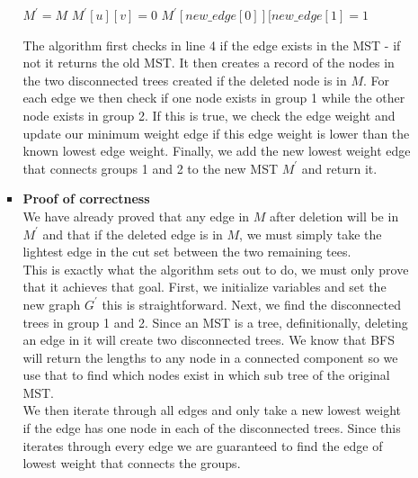 \documentclass[letterpaper,11pt]{article}
\begin{document}
\begin{enumerate}
\begin{enumerate}
\begin{itemize}
\begin{algorithm}[H]
                    $M^{\prime} = M$ \;
                    $M^{\prime}[u][v] = 0$ \;
                    $M^{\prime}[new\_edge[0]][new\_edge[1] = 1$ \;

                \end{algorithm}

                The algorithm first checks in line 4 if the edge exists in the 
                MST - if not it returns the old MST. It then creates a record
                of the nodes in the two disconnected trees created if the 
                deleted node is in $M$. For each edge we then check if one node
                exists in group 1 while the other node exists in group 2. If this
                is true, we check the edge weight and update our minimum weight
                edge if this edge weight is lower than the known lowest edge weight.
                Finally, we add the new lowest weight edge that connects groups 
                1 and 2 to the new MST $M^{\prime}$ and return it.\\


                \item \textbf{Proof of correctness}\\
                     
                    We have already proved that any edge in $M$ after deletion 
                    will be in $M^{\prime}$ and that if the deleted edge is in
                    $M$, we must simply take the lightest edge in the cut set 
                    between the two remaining tees.\\

                    This is exactly what the algorithm sets out to do, we must 
                    only prove that it achieves that goal. First, we initialize 
                    variables and set the new graph $G^{\prime}$ this is 
                    straightforward. Next, we find the disconnected trees in 
                    group 1 and 2. Since an MST is a tree, definitionally, 
                    deleting an edge in it will create two disconnected trees. 
                    We know that BFS will return the lengths to any node in a
                    connected component so we use that to find which nodes exist
                    in which sub tree of the original MST. \\

                    We then iterate through all edges and only take a new lowest
                    weight if the edge has one node in each of the disconnected 
                    trees. Since this iterates through every edge we are guaranteed 
                    to find the edge of lowest weight that connects the groups.\\


\end{itemize}
\end{enumerate}
\end{enumerate}
\end{document}
